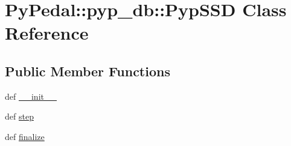 \hypertarget{classPyPedal_1_1pyp__db_1_1PypSSD}{
\section{PyPedal::pyp\_\-db::PypSSD Class Reference}
\label{classPyPedal_1_1pyp__db_1_1PypSSD}
}
\subsection*{Public Member Functions}
\begin{CompactItemize}
\item 
\hypertarget{classPyPedal_1_1pyp__db_1_1PypSSD_dbcde92e8e076b59754cac5a54e7674a}{
def \hyperlink{classPyPedal_1_1pyp__db_1_1PypSSD_dbcde92e8e076b59754cac5a54e7674a}{\_\-\_\-init\_\-\_\-}}
\label{classPyPedal_1_1pyp__db_1_1PypSSD_dbcde92e8e076b59754cac5a54e7674a}

\item 
\hypertarget{classPyPedal_1_1pyp__db_1_1PypSSD_dbf5a87e542b490b2e1b4b70a2b92d1e}{
def \hyperlink{classPyPedal_1_1pyp__db_1_1PypSSD_dbf5a87e542b490b2e1b4b70a2b92d1e}{step}}
\label{classPyPedal_1_1pyp__db_1_1PypSSD_dbf5a87e542b490b2e1b4b70a2b92d1e}

\item 
\hypertarget{classPyPedal_1_1pyp__db_1_1PypSSD_e2808892915addae94f7ca04773af032}{
def \hyperlink{classPyPedal_1_1pyp__db_1_1PypSSD_e2808892915addae94f7ca04773af032}{finalize}}
\label{classPyPedal_1_1pyp__db_1_1PypSSD_e2808892915addae94f7ca04773af032}

\end{CompactItemize}
